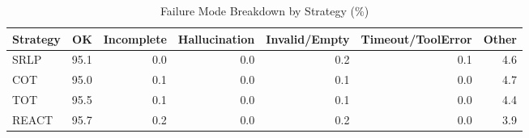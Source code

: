 \begin{table}[htbp]
\centering
\caption{Failure Mode Breakdown by Strategy (\%)}
\label{tab:error_breakdown}
\begin{tabular}{lrrrrrr}
\toprule
Strategy & OK & Incomplete & Hallucination & Invalid/Empty & Timeout/ToolError & Other \\
\midrule
SRLP & 95.1 & 0.0 & 0.0 & 0.2 & 0.1 & 4.6 \\
COT & 95.0 & 0.1 & 0.0 & 0.1 & 0.0 & 4.7 \\
TOT & 95.5 & 0.1 & 0.0 & 0.1 & 0.0 & 4.4 \\
REACT & 95.7 & 0.2 & 0.0 & 0.2 & 0.0 & 3.9 \\
\bottomrule
\end{tabular}
\end{table}